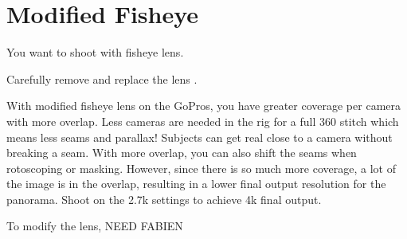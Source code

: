 \chapter{Modified Fisheye}
\pagecolor{white}
\label{chap:26}
\begin{fullwidth}

\problem

{\large You want to shoot with fisheye lens.  \par}


\solution

{\large Carefully remove and replace the lens .  
 \par}

With modified fisheye lens on the GoPros, you have greater coverage per camera with more overlap. Less cameras are needed in the rig for a full 360 stitch which means less seams and parallax! Subjects can get real close to a camera without breaking a seam. With more overlap, you can also shift the seams when rotoscoping or masking. However, since there is so much more coverage, a lot of the image is in the overlap, resulting in a lower final output resolution for the panorama. Shoot on the 2.7k settings to achieve 4k final output. 


To modify the lens, NEED FABIEN




\clearpage
\end{fullwidth}
